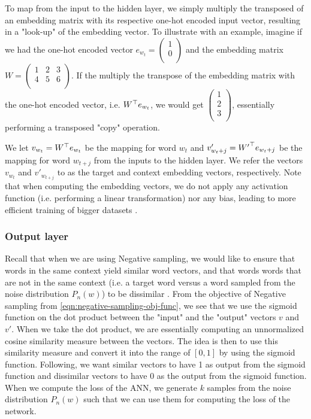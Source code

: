 To map from the input to the hidden layer, we simply multiply the transposed of an embedding matrix with its respective one-hot encoded input vector, resulting in a "look-up" of the embedding vector. To illustrate with an example, imagine if we had the one-hot encoded vector $e_{w_t} = \left( \begin{smallmatrix}
    1\\
    0\\
\end{smallmatrix} \right)$ and the embedding matrix $W = \left( \begin{smallmatrix}
    1 & 2 & 3\\
    4 & 5 & 6\\
\end{smallmatrix} \right)$. If the multiply the transpose of the embedding matrix with the one-hot encoded vector, i.e. ${W}^\top e_{w_t}$, we would get $\left( \begin{smallmatrix}
    1\\
    2\\
    3\\
\end{smallmatrix} \right)$, essentially performing a transposed "copy" operation.


We let $v_{w_t} = {W}^\top e_{w_t}$ be the mapping for word $w_t$ and $v'_{w_t+j} = {W'}^\top e_{w_t{+j}}$ be the mapping for word $w_{t+j}$ from the inputs to the hidden layer. We refer the vectors $v_{w_t}$ and $v'_{w_{t+j}}$ to as the target and context embedding vectors, respectively. Note that when computing the embedding vectors, we do not apply any activation function (i.e. performing a linear transformation) nor any bias, leading to more efficient training of bigger datasets \cite{mikolov2013a}.

\subsubsection{Output layer}
Recall that when we are using Negative sampling, we would like to ensure that words in the same context yield similar word vectors, and that words words that are not in the same context (i.e. a target word versus a word sampled from the noise distribution $P_n(w)$) to be dissimilar \cite{mikolov2013b}. From the objective of Negative sampling from \cref{eqn:negative-sampling-obj-func}, we see that we use the sigmoid function on the dot product between the "input" and the "output" vectors $v$ and $v'$. When we take the dot product, we are essentially computing an unnormalized cosine similarity measure between the vectors. The idea is then to use this similarity measure and convert it into the range of $[0, 1]$ by using the sigmoid function. Following, we want similar vectors to have 1 as output from the sigmoid function and dissimilar vectors to have 0 as the output from the sigmoid function. When we compute the loss of the ANN, we generate $k$ samples from the noise distribution $P_n(w)$ such that we can use them for computing the loss of the network.


